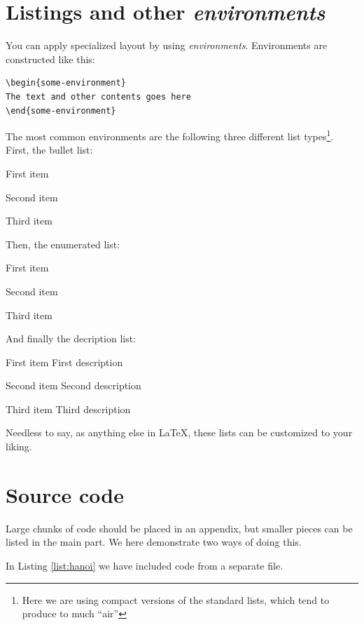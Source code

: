 \section{Listings and other {\em environments}}

You can apply specialized layout by using  {\em environments}. Environments are constructed like this:

\begin{lstlisting}[float=htpb]
\begin{some-environment}
The text and other contents goes here
\end{some-environment}
\end{lstlisting}

The most common environments are the following three different list types\footnote{Here we are using compact versions of the standard lists, which tend to produce to much ``air''}. First, the bullet list:

\begin{compactitem}
\item First item
\item Second item
\item Third item
\end{compactitem}
Then, the enumerated list:
\begin{compactenum}
\item First item
\item Second item
\item Third item
\end{compactenum}
And finally the decription list:
\begin{compactdesc}
\item [First item] First description \lipsum[5]
\item [Second item] Second description
\item [Third item] Third description
\end{compactdesc}

Needless to say, as anything else in \LaTeX, these lists can be customized to your liking.

\section{Source code}
\label{sec:sourcecode} 

Large chunks of code should be placed in an appendix, but smaller pieces can be listed in the main part. We here demonstrate two ways of doing this.

In Listing \ref{list:hanoi} we have included code from a separate file.

